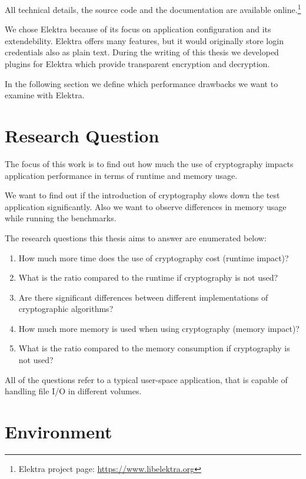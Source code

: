 All technical details, the source code and the documentation are available online.\footnote{Elektra project page: \url{https://www.libelektra.org}}

We chose Elektra because of its focus on application configuration and its extendebility.
Elektra offers many features, but it would originally store login credentials also as plain text.
During the writing of this thesis we developed plugins for Elektra which provide transparent encryption and decryption.

In the following section we define which performance drawbacks we want to examine with Elektra.

\section{Research Question}

The focus of this work is to find out how much the use of cryptography
impacts application performance in terms of runtime and memory
usage.

We want to find out if the introduction of cryptography slows down the test application significantly.
Also we want to observe differences in memory usage while running the benchmarks.

The research questions this thesis aims to answer are enumerated below:

\begin{enumerate}
\def\labelenumi{\arabic{enumi}.}
\tightlist
\item
  How much more time does the use of cryptography cost (runtime impact)?
\item
  What is the ratio compared to the runtime if cryptography is not used?
\item
  Are there significant differences between different implementations of cryptographic algorithms?
\item
  How much more memory is used when using cryptography (memory impact)?
\item
  What is the ratio compared to the memory consumption if cryptography
  is not used?
\end{enumerate}

All of the questions refer to a typical user-space application, that is capable of handling file I/O in different volumes.

\section{Environment}

